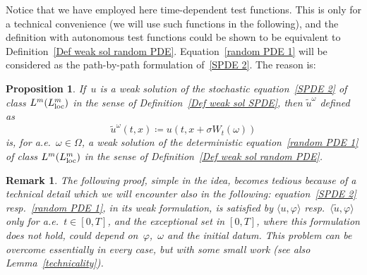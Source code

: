 \documentclass[a4paper,10pt]{article}
\newtheorem{proposition}[theorem]{Proposition}
\newtheorem{remark}[theorem]{Remark}
\newcommand\1{\mathbbm{1}}
\newcommand{\lan}{\langle}
\newcommand{\ran}{\rangle}
\newcommand{\td}{\tilde}
\newcommand\loc{{\rm loc}}
\numberwithin{equation}{section}
\begin{document}
Notice that we have employed here time-dependent test functions. This is only for a technical convenience (we will use such functions in the following), and the definition with autonomous test functions could be shown to be equivalent to Definition~\ref{Def weak sol random PDE}. Equation~\eqref{random PDE 1} will be considered as the path-by-path
formulation of~\eqref{SPDE 2}. The reason is:

\begin{proposition}
\label{Prop equivalence}If~$u$ is a weak solution of the stochastic equation~\eqref{SPDE 2} of class $L^{m}(L^{m}_\loc)$ in the sense of Definition~\ref{Def weak sol SPDE}, then $\widetilde{u}^{\omega}$ defined as
\begin{equation*}
\widetilde{u}^{\omega}(t,x)  \coloneqq u(t,x+\sigma W_{t}(\omega))
\end{equation*}
is, for a.e.~$\omega\in\Omega$, a weak solution of the deterministic equation~\eqref{random PDE 1} of class $L^{m}(L^{m}_\loc)$ in the sense of Definition~\ref{Def weak sol random PDE}.
\end{proposition}

\begin{remark}\label{techrmk}
The following proof, simple in the idea, becomes tedious because of a technical detail which we will encounter also in the following: equation~\eqref{SPDE 2} resp.~\eqref{random PDE 1}, in its weak formulation, is satisfied by $\lan u,\varphi\ran$ resp.~$\lan\td{u},\varphi\ran$ only for a.e.~$t \in [0,T]$, and the exceptional set in $[0,T]$, where this formulation does not hold, could depend on~$\varphi$,~$\omega$ and the initial datum. This problem can be overcome essentially in every case, but with some small work \textup{(}see also Lemma~\ref{technicality}\textup{)}.
\end{remark}
\end{document}
